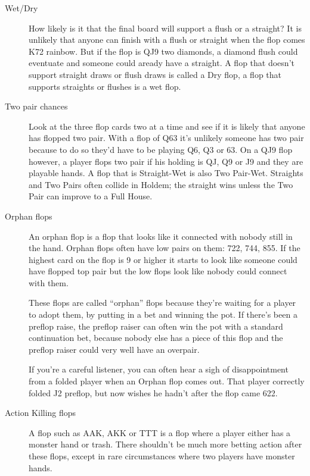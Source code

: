 \begin{description}

\item[Wet/Dry] How likely is it that the final board will support a
flush or a straight? It is unlikely that anyone can finish with a
flush or straight when the flop comes K72 rainbow. But if the flop is
QJ9 two diamonds, a diamond flush could eventuate and someone could
aready have a straight. A flop that doesn't support straight draws or
flush draws is called a Dry flop, a flop that supports straights or
flushes is a wet flop.

\item[Two pair chances] Look at the three flop cards two at a time and
see if it is likely that anyone has flopped two pair. With a flop of
Q63 it's unlikely someone has two pair because to do so they'd have to
be playing Q6, Q3 or 63. On a QJ9 flop however, a player flops two
pair if his holding is QJ, Q9 or J9 and they are playable hands.
A flop that is Straight-Wet is also Two Pair-Wet. Straights and Two
Pairs often collide in Holdem; the straight wins unless the Two Pair
can improve to a Full House.

\item[Orphan flops] An orphan flop is a flop that looks like it
connected with nobody still in the hand. Orphan flops often have low
pairs on them: 722, 744, 855. If the highest card on the flop is 9 or
higher it starts to look like someone could have flopped top pair but
the low flops look like nobody could connect with them.

These flops are called ``orphan'' flops because they're waiting for a
player to adopt them, by putting in a bet and winning the pot. If
there's been a preflop raise, the preflop raiser can often win the pot
with a standard continuation bet, because nobody else has a piece of
this flop and the preflop raiser could very well have an overpair.

If you're a careful listener, you can often hear a sigh of
disappointment from a folded player when an Orphan flop comes out.
That player correctly folded J2 preflop, but now wishes he hadn't
after the flop came 622.

\item[Action Killing flops] A flop such as AAK, AKK or TTT is a flop
where a player either has a monster hand or trash. There shouldn't be
much more betting action after these flops, except in rare
circumstances where two players have monster hands.

\end{description}

